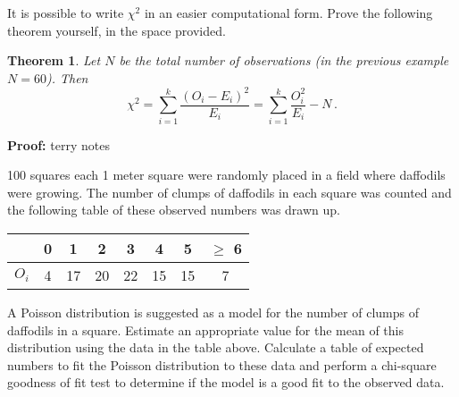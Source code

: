\documentclass[12pt]{article}
\newtheorem{theorem}{Theorem}[section]
\newenvironment{example}[1][Example:]{\begin{trivlist}
\item[\hskip \labelsep {\bfseries #1}]}{\end{trivlist}}
\begin{document}
It is possible to write $\chi^2$ in an easier computational form. Prove the following theorem yourself, in the space provided.
\begin{theorem}
Let $N$ be the total number of observations {(\rm in the previous example $N=60$)}. Then
$$
\chi^{2}=\sum_{i=1}^{k}\frac{(O_{i}-E_{i})^2}{E_{i}}=\sum_{i=1}^{k}\frac{O_{i}^{2}}{E_{i}}-N \, .
$$
\end{theorem}

\begin{mdframed}
{\bf Proof:}
\textcolor[rgb]{1.00,1.00,1.00}{terry notes\lipsum[1-7]}
\end{mdframed}

\begin{example}
100 squares each 1 meter square were randomly placed in a field where daffodils were growing. The number of clumps of daffodils in each square was counted and the following table of these observed numbers was drawn up.
\begin{center}
\begin{tabular}{|c|c|c|c|c|c|c|c|}
  \hline
   & 0 & 1 & 2 & 3 & 4 & 5 & $\geq$ 6\\ \hline
  $O_{i}$ & 4 & 17 & 20 & 22 & 15 & 15 & 7 \\
  \hline
\end{tabular}
\end{center}
A Poisson distribution is suggested as a model for the number of clumps of daffodils in a square. Estimate an appropriate value for the mean of this distribution using the data in the table above. Calculate a table of expected numbers to fit the Poisson distribution to these data and perform a chi-square goodness of fit test to determine if the model is a good fit to the observed data.
\end{example}
\end{document}
